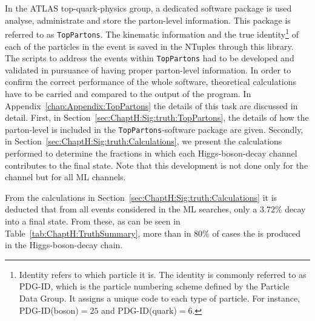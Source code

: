 In the ATLAS top-quark-physics group, a dedicated software package 
is used analyse, administrate and store the parton-level information. 
This package is referred to as \texttt{TopPartons}. %
The kinematic information and the 
true identity\footnote{Identity refers to which particle it is.
 The identity is commonly referred to as PDG-ID, which is the particle 
 numbering scheme defined by the Particle Data Group. 
It assigns a unique code to each type of particle. 
For instance, PDG-ID(\PHiggs boson)$ = 25$ 
and PDG-ID(\Ptop quark)$ = 6$.} of each of the particles 
in the event is saved in the NTuples through this library. The scripts to address
the \tHq events within \texttt{TopPartons} had to be developed and validated in
pursuance of having proper parton-level information.
In order to confirm the correct performance of the whole software, 
theoretical calculations have to be carried and compared
to the output of the program.    
In Appendix~\ref{chap:Appendix:TopPartons} the details of this task are discussed
in detail. First, in Section~\ref{sec:ChaptH:Sig:truth:TopPartons}, the details
of how the parton-level is included in the \texttt{TopPartons}-software package are
given. Secondly, in Section~\ref{sec:ChaptH:Sig:truth:Calculations}, we present the calculations
performed to determine the fractions in which each Higgs-boson-decay channel 
contributes to the \dileptau final state. Note that this development is not done only
for the \dileptau channel but for all ML channels. 

From the calculations in Section~\ref{sec:ChaptH:Sig:truth:Calculations} it
is deducted that from all \tHq events considered in the ML searches,
only a $3.72\%$ decay into a \dileptau final state. %
From these, as can be seen in Table~\ref{tab:ChaptH:TruthSummary}, 
more than in 80\% of cases the \tauhad is produced in
the Higgs-boson-decay chain. 

